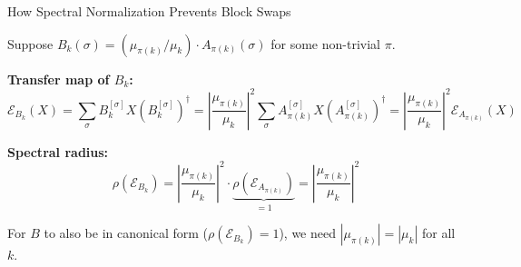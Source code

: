 \documentclass[aspectratio=169,10pt]{beamer}
\begin{document}
\begin{frame}{How Spectral Normalization Prevents Block Swaps}
\vspace{-0.5em}

Suppose $B_k(\sigma) = (\mu_{\pi(k)}/\mu_k)\cdot A_{\pi(k)}(\sigma)$ for some non-trivial $\pi$.

\vspace{0.3em}
\textbf{Transfer map of $B_k$:}
\[
  \mathcal{E}_{B_k}(X)
  = \sum_\sigma B_k^{[\sigma]} X (B_k^{[\sigma]})^\dagger
  = \left|\frac{\mu_{\pi(k)}}{\mu_k}\right|^2
    \sum_\sigma A_{\pi(k)}^{[\sigma]} X (A_{\pi(k)}^{[\sigma]})^\dagger
  = \left|\frac{\mu_{\pi(k)}}{\mu_k}\right|^2 \mathcal{E}_{A_{\pi(k)}}(X)
\]

\vspace{0.3em}
\textbf{Spectral radius:}
\[
  \rho(\mathcal{E}_{B_k})
  = \left|\frac{\mu_{\pi(k)}}{\mu_k}\right|^2 \cdot
    \underbrace{\rho(\mathcal{E}_{A_{\pi(k)}})}_{= 1}
  = \left|\frac{\mu_{\pi(k)}}{\mu_k}\right|^2
\]

\vspace{0.3em}
For $B$ to also be in canonical form ($\rho(\mathcal{E}_{B_k}) = 1$), we need
$|\mu_{\pi(k)}| = |\mu_k|$ for all $k$.

\vspace{0.5em}
\begin{center}
\end{center}
\end{frame}
\end{document}
